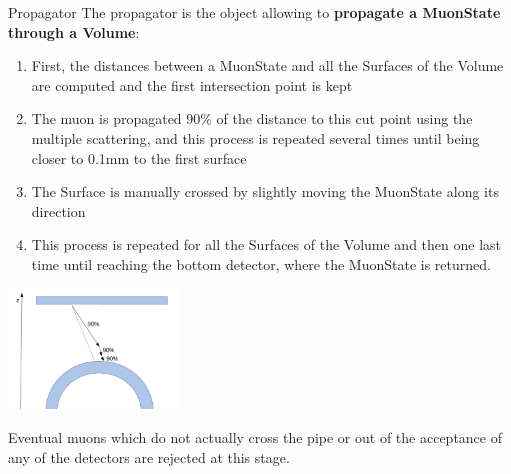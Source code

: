 \documentclass[8 pt]{beamer}
\begin{document}
\begin{frame}{Propagator}
\justifying
The propagator is the object allowing to \textbf{propagate a MuonState through a Volume}: \vfill

\begin{minipage}[c]{.59\textwidth}
\begin{enumerate}
\justifying
\item First, the distances between a MuonState and all the Surfaces of the Volume are computed and the first intersection point is kept \vspace{5pt}
\item The muon is propagated 90\% of the distance to this cut point using the multiple scattering, and this process is repeated several times until being closer to 0.1mm to the first surface \vspace{5pt}
\item The Surface is manually crossed by slightly moving the MuonState along its direction \vspace{5pt}
\item This process is repeated for all the Surfaces of the Volume and then one last time until reaching the bottom detector, where the MuonState is returned.
\end{enumerate}
\end{minipage}
\begin{minipage}[c]{.40\textwidth}
\includegraphics[width=4.5cm, height=3.2cm]{figs/propagation.png}
\end{minipage} \vfill

Eventual muons which do not actually cross the pipe or out of the acceptance of any of the detectors are rejected at this stage. \vfill
\end{frame}
\end{document}
